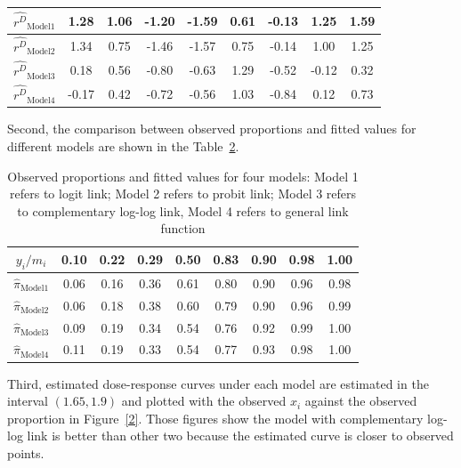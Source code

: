 \documentclass[]{article}
\begin{document}
\begin{enumerate}
{\begin{itemize}
\begin{table}[ht!]
        		\begin{tabular}{c|c|c|c|c|c|c|c|c}
        			\hline
        			$\hat{r^D}_{\mathrm{Model 1}}$ & 1.28 & 1.06 & -1.20 & -1.59 &  0.61  & -0.13 & 1.25  & 1.59 \\
        			\hline
        			$\hat{r^D}_{\mathrm{Model 2}}$ & 1.34 & 0.75  & -1.46  & -1.57 &  0.75 &-0.14 & 1.00 & 1.25 \\
        			\hline
        			$\hat{r^D}_{\mathrm{Model 3}}$ & 0.18 & 0.56 & -0.80 & -0.63 & 1.29 &-0.52& -0.12 & 0.32  \\
        			\hline
        			$\hat{r^D}_{\mathrm{Model 4}}$ & -0.17 & 0.42& -0.72& -0.56 & 1.03 &-0.84&  0.12 & 0.73    \\
        			\hline
        		\end{tabular}
        		\label{0}
        	\end{table}
        	Second, the comparison between observed proportions and fitted values for different models are shown in the Table~\ref{cmp}.\par
        	\begin{table}[ht!]
        		\centering
        		\caption{Observed proportions and fitted values for four models: Model 1 refers to logit link; Model 2 refers to probit link; Model 3 refers to complementary log-log link, Model 4 refers to general link function}
        		\begin{tabular}{c|c|c|c|c|c|c|c|c}
        			\hline
        			$y_i/m_i$ & 0.10 & 0.22 & 0.29 & 0.50 & 0.83 & 0.90 & 0.98 & 1.00 \\
        		    \hline
        		    $\hat{\pi}_{\mathrm{Model 1}}$ & 0.06 & 0.16 & 0.36 & 0.61 & 0.80 & 0.90 & 0.96 & 0.98\\
        		    \hline
        		    $\hat{\pi}_{\mathrm{Model 2}}$ & 0.06 & 0.18 & 0.38 & 0.60 & 0.79 & 0.90 & 0.96 & 0.99\\
        		    \hline
        		    $\hat{\pi}_{\mathrm{Model 3}}$ & 0.09 & 0.19 & 0.34 & 0.54 & 0.76 & 0.92 & 0.99 & 1.00 \\
        		    \hline
        		    $\hat{\pi}_{\mathrm{Model 4}}$ & 0.11 & 0.19 & 0.33 & 0.54 & 0.77 & 0.93 & 0.98 & 1.00\\
        		    \hline
        		\end{tabular}
        		\label{cmp}
        	\end{table}
            Third, estimated dose-response curves under each model are estimated in the interval $(1.65, 1.9)$ and plotted with the observed $x_i$ against the observed proportion in Figure~\ref{2}. Those figures show the model with complementary log-log link is better than other two because the estimated curve is closer to observed points.

\end{itemize}}
\end{enumerate}
\end{document}

